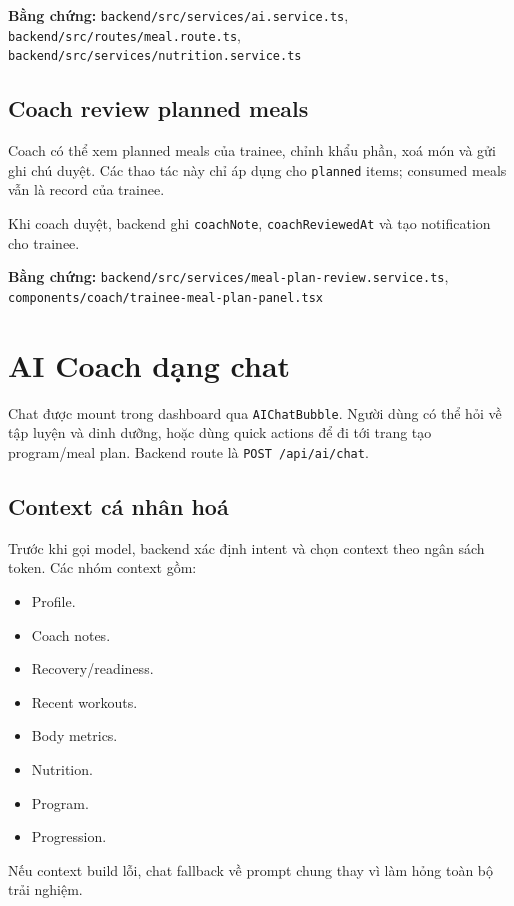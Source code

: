 \documentclass[12pt,a4paper]{article}
\newcommand{\code}[1]{\texttt{#1}}
\newcommand{\evidence}[1]{{\small\nolinkurl{#1}}}
\begin{document}
\textbf{Bằng chứng:} \evidence{backend/src/services/ai.service.ts}, \evidence{backend/src/routes/meal.route.ts}, \evidence{backend/src/services/nutrition.service.ts}

\subsection{Coach review planned meals}

Coach có thể xem planned meals của trainee, chỉnh khẩu phần, xoá món và gửi ghi chú duyệt. Các thao tác này chỉ áp dụng cho \code{planned} items; consumed meals vẫn là record của trainee.

Khi coach duyệt, backend ghi \code{coachNote}, \code{coachReviewedAt} và tạo notification cho trainee.

\textbf{Bằng chứng:} \evidence{backend/src/services/meal-plan-review.service.ts}, \evidence{components/coach/trainee-meal-plan-panel.tsx}

\section{AI Coach dạng chat}

Chat được mount trong dashboard qua \code{AIChatBubble}. Người dùng có thể hỏi về tập luyện và dinh dưỡng, hoặc dùng quick actions để đi tới trang tạo program/meal plan. Backend route là \code{POST /api/ai/chat}.

\subsection{Context cá nhân hoá}

Trước khi gọi model, backend xác định intent và chọn context theo ngân sách token. Các nhóm context gồm:

\begin{itemize}
  \item Profile.
  \item Coach notes.
  \item Recovery/readiness.
  \item Recent workouts.
  \item Body metrics.
  \item Nutrition.
  \item Program.
  \item Progression.
\end{itemize}

Nếu context build lỗi, chat fallback về prompt chung thay vì làm hỏng toàn bộ trải nghiệm.
\end{document}
